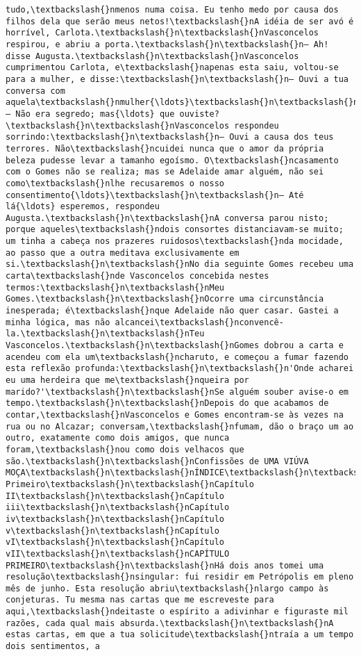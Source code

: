 \documentclass[11pt]{article}
\begin{document}
\begin{Verbatim}[commandchars=\\\{\}]
tudo,\textbackslash{}nmenos numa coisa. Eu tenho medo por causa dos filhos dela que serão meus netos!\textbackslash{}nA idéia de ser avó é horrível, Carlota.\textbackslash{}n\textbackslash{}nVasconcelos respirou, e abriu a porta.\textbackslash{}n\textbackslash{}n— Ah! disse Augusta.\textbackslash{}n\textbackslash{}nVasconcelos cumprimentou Carlota, e\textbackslash{}napenas esta saiu, voltou-se para a mulher, e disse:\textbackslash{}n\textbackslash{}n— Ouvi a tua conversa com aquela\textbackslash{}nmulher{\ldots}\textbackslash{}n\textbackslash{}n— Não era segredo; mas{\ldots} que ouviste?\textbackslash{}n\textbackslash{}nVasconcelos respondeu sorrindo:\textbackslash{}n\textbackslash{}n— Ouvi a causa dos teus terrores. Não\textbackslash{}ncuidei nunca que o amor da própria beleza pudesse levar a tamanho egoísmo. O\textbackslash{}ncasamento com o Gomes não se realiza; mas se Adelaide amar alguém, não sei como\textbackslash{}nlhe recusaremos o nosso consentimento{\ldots}\textbackslash{}n\textbackslash{}n— Até lá{\ldots} esperemos, respondeu Augusta.\textbackslash{}n\textbackslash{}nA conversa parou nisto; porque aqueles\textbackslash{}ndois consortes distanciavam-se muito; um tinha a cabeça nos prazeres ruidosos\textbackslash{}nda mocidade, ao passo que a outra meditava exclusivamente em si.\textbackslash{}n\textbackslash{}nNo dia seguinte Gomes recebeu uma carta\textbackslash{}nde Vasconcelos concebida nestes termos:\textbackslash{}n\textbackslash{}nMeu Gomes.\textbackslash{}n\textbackslash{}nOcorre uma circunstância inesperada; é\textbackslash{}nque Adelaide não quer casar. Gastei a minha lógica, mas não alcancei\textbackslash{}nconvencê-la.\textbackslash{}n\textbackslash{}nTeu Vasconcelos.\textbackslash{}n\textbackslash{}nGomes dobrou a carta e acendeu com ela um\textbackslash{}ncharuto, e começou a fumar fazendo esta reflexão profunda:\textbackslash{}n\textbackslash{}n'Onde acharei eu uma herdeira que me\textbackslash{}nqueira por marido?'\textbackslash{}n\textbackslash{}nSe alguém souber avise-o em tempo.\textbackslash{}n\textbackslash{}nDepois do que acabamos de contar,\textbackslash{}nVasconcelos e Gomes encontram-se às vezes na rua ou no Alcazar; conversam,\textbackslash{}nfumam, dão o braço um ao outro, exatamente como dois amigos, que nunca foram,\textbackslash{}nou como dois velhacos que são.\textbackslash{}n\textbackslash{}nConfissões de UMA VIÚVA MOÇA\textbackslash{}n\textbackslash{}nÍNDICE\textbackslash{}n\textbackslash{}nCapítulo Primeiro\textbackslash{}n\textbackslash{}nCapítulo II\textbackslash{}n\textbackslash{}nCapítulo iii\textbackslash{}n\textbackslash{}nCapítulo iv\textbackslash{}n\textbackslash{}nCapítulo v\textbackslash{}n\textbackslash{}nCapítulo vI\textbackslash{}n\textbackslash{}nCapítulo vII\textbackslash{}n\textbackslash{}nCAPÍTULO PRIMEIRO\textbackslash{}n\textbackslash{}nHá dois anos tomei uma resolução\textbackslash{}nsingular: fui residir em Petrópolis em pleno mês de junho. Esta resolução abriu\textbackslash{}nlargo campo às conjeturas. Tu mesma nas cartas que me escreveste para aqui,\textbackslash{}ndeitaste o espírito a adivinhar e figuraste mil razões, cada qual mais absurda.\textbackslash{}n\textbackslash{}nA estas cartas, em que a tua solicitude\textbackslash{}ntraía a um tempo dois sentimentos, a 
\end{Verbatim}
\end{document}
